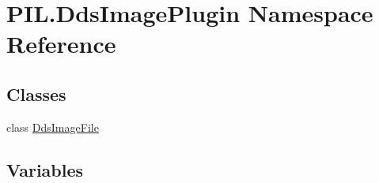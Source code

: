 \hypertarget{namespacePIL_1_1DdsImagePlugin}{}\section{P\+I\+L.\+Dds\+Image\+Plugin Namespace Reference}
\label{namespacePIL_1_1DdsImagePlugin}
\subsection*{Classes}
\begin{DoxyCompactItemize}
\item 
class \hyperlink{classPIL_1_1DdsImagePlugin_1_1DdsImageFile}{Dds\+Image\+File}
\end{DoxyCompactItemize}
\subsection*{Variables}
